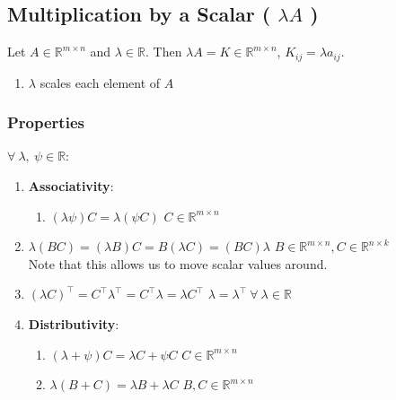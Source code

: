 \subsection{Multiplication by a Scalar ( $\lambda A$ )}

Let $A \in \mathbb{R}^{m\times n}$ and $\lambda \in \mathbb{R}$. Then $\lambda A = K \in \mathbb{R}^{m\times n}$, $K_{ij} = \lambda a_{ij}$.
\hfill \cite{mfml/book/mml/Deisenroth-Faisal-Ong}


\begin{enumerate}
    \item $\lambda$ scales each element of $A$
    \hfill \cite{mfml/book/mml/Deisenroth-Faisal-Ong}

    
\end{enumerate}


\subsubsection{Properties}

$\forall\ \lambda,\ \psi \in \mathbb{R}$:
\vspace{0.2cm}
\begin{enumerate}
    \item \textbf{Associativity}:
    \begin{enumerate}
        \item $(\lambda \psi )C = \lambda (\psi C)$ \hfill $C \in  \mathbb{R}^{m\times n}$
        \hfill \cite{mfml/book/mml/Deisenroth-Faisal-Ong}
    \end{enumerate}

    \item $\lambda (BC) = (\lambda B)C = B(\lambda C) = (BC)\lambda $ \hfill $B \in  \mathbb{R}^{m\times n}, C \in  \mathbb{R}^{n\times k}$
    \hfill \cite{mfml/book/mml/Deisenroth-Faisal-Ong}
    \\
    Note that this allows us to move scalar values around.
    \hfill \cite{mfml/book/mml/Deisenroth-Faisal-Ong}

    \item $(\lambda C) ^\top  = C^\top \lambda ^\top  = C^\top \lambda  = \lambda C^\top $
    \hfill $\lambda  = \lambda ^\top \  \forall \ \lambda  \in  \mathbb{R}$
    \hfill \cite{mfml/book/mml/Deisenroth-Faisal-Ong}

    \item \textbf{Distributivity}:
    \begin{enumerate}
        \item $(\lambda  + \psi )C = \lambda C + \psi C$
        \hfill $C \in  \mathbb{R}^{m\times n}$
        \hfill \cite{mfml/book/mml/Deisenroth-Faisal-Ong}

        \item $\lambda (B + C) = \lambda B + \lambda C$
        \hfill $B, C \in  \mathbb{R}^{m\times n}$
        \hfill \cite{mfml/book/mml/Deisenroth-Faisal-Ong}
        
    \end{enumerate}
\end{enumerate}





